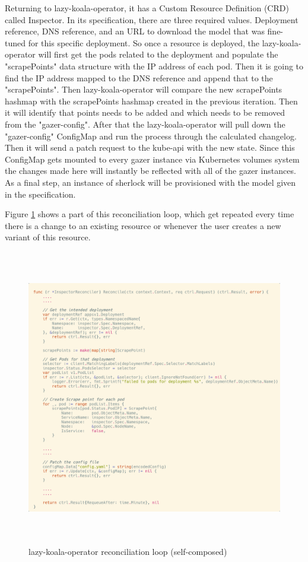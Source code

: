 Returning to \ac{lazy-koala-operator}, it has a Custom Resource Definition (CRD) called Inspector. In its specification, there are three required values. Deployment reference, DNS reference, and an URL to download the model that was fine-tuned for this specific deployment. So once a resource is deployed, the \ac{lazy-koala-operator} will first get the pods related to the deployment and populate the "scrapePoints" data structure with the IP address of each pod. Then it is going to find the IP address mapped to the DNS reference and append that to the "scrapePoints". Then \ac{lazy-koala-operator} will compare the new scrapePoints hashmap with the scrapePoints hashmap created in the previous iteration. Then it will identify that points needs to be added and which needs to be removed from the "gazer-config". After that the \ac{lazy-koala-operator} will pull down the "gazer-config" ConfigMap and run the process through the calculated changelog. Then it will send a patch request to the kube-api with the new state. Since this ConfigMap gets mounted to every \ac{gazer} instance via Kubernetes volumes system the changes made here will instantly be reflected with all of the \ac{gazer} instances. As a final step, an instance of \ac{sherlock} will be provisioned with the model given in the specification.

Figure \ref{fig:reconcile-loop} shows a part of this reconciliation loop, which get repeated every time there is a change to an existing resource or whenever the user creates a new variant of this resource.

\begin{figure}[H]
    \includegraphics[height=13cm]{assets/implementation/reconcile-loop.png}
    \caption{\ac{lazy-koala-operator} reconciliation loop (self-composed)}
    \label{fig:reconcile-loop}
\end{figure}



